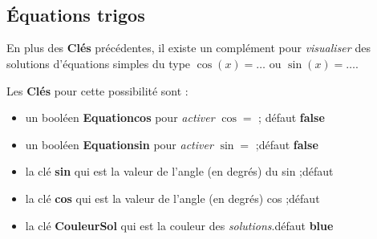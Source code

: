 \documentclass[a4paper,french,11pt]{article}
\newcommand\Cle[1]{{\bfseries\sffamily\textlangle #1\textrangle}}
\begin{document}
\begin{codesortie}
\begin{center}
	\begin{tikzpicture}[line join=bevel]
			\CercleTrigo[Rayon=2.5,AffValeurs=false,Decal=8pt]
		\end{tikzpicture}
	~~~~
	\begin{tikzpicture}[line join=bevel]
			\CercleTrigo[Rayon=2.5,AffAngles=false]
		\end{tikzpicture}
	~~~~
	\begin{tikzpicture}[line join=bevel]
			\CercleTrigo[Rayon=2.5,MoinsPi=false,CouleurFond=orange!15,TailleValeurs=\tiny]
		\end{tikzpicture}
\end{center}
\end{codesortie}

\subsection{Équations trigos}

\begin{codeinfo}
En plus des \Cle{Clés} précédentes, il existe un complément pour \textit{visualiser} des solutions d'équations simples du type $\cos(x)=\ldots$ ou $\sin(x)=\ldots$.
\end{codeinfo}

\begin{codecles}
Les \Cle{Clés} pour cette possibilité sont :

\begin{itemize}
	\item un booléen \Cle{Equationcos} pour \textit{activer} \og $\cos=$ \fg; \hfill{}défaut \Cle{false}
	\item un booléen \Cle{Equationsin} pour \textit{activer} \og $\sin=$ \fg;\hfill{}défaut \Cle{false}
	\item la clé \Cle{sin} qui est la valeur de l'angle (en degrés) du sin ;\hfill{}défaut \Cle{30}
	\item la clé \Cle{cos} qui est la valeur de l'angle (en degrés) cos ;\hfill{}défaut \Cle{45}
	\item la clé \Cle{CouleurSol} qui est la couleur des \textit{solutions}.\hfill{}défaut \Cle{blue}
\end{itemize}
\end{codecles}
\end{document}
